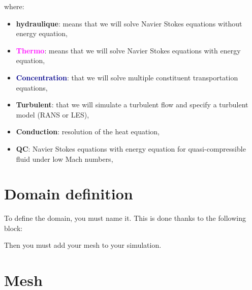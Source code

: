 where:
\begin{itemize}
\item \textbf{hydraulique}: means that we will solve Navier Stokes equations without energy equation,
\item \textbf{\textcolor{magenta}{Thermo}}: means that we will solve Navier Stokes equations with energy equation,
\item \textbf{\textcolor{darkblue}{Concentration}}: that we will solve multiple constituent transportation equations,
\item \textbf{\textcolor{Greeen}{Turbulent}}: that we will simulate a turbulent flow and specify a turbulent model (RANS or LES),
\item \textbf{Conduction}: resolution of the heat equation,
\item \textbf{QC}: Navier Stokes equations with energy equation for quasi-compressible fluid under low Mach numbers,
\end{itemize}





\section{Domain definition}
To define the domain, you must name it. This is done thanks to the following block:

    \begin{center}
    \end{center}

Then you must add your mesh to your simulation.




\section{Mesh} \label{Mesh}

